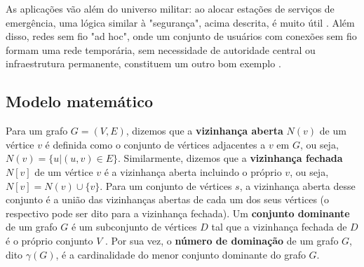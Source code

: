 \documentclass[11pt]{article}
\begin{document}
As aplicações vão além do universo militar: ao alocar estações de serviços de emergência, uma lógica similar à "segurança", acima descrita, é muito útil \autocite{GhaffariHadigheh2019Romandominationproblem}.
Além disso, redes sem fio "ad hoc", onde um conjunto de usuários com conexões sem fio formam uma rede temporária, sem necessidade de autoridade central ou infraestrutura permanente, constituem um outro bom exemplo \autocite{Wu2000Dominationitsapplications}.


\subsection{Modelo matemático}
\label{sec:orgb40ae0c}
Para um grafo \(G = (V, E)\), dizemos que a \textbf{vizinhança aberta} \(N(v)\) de um vértice \(v\) é definida como o conjunto de vértices adjacentes a \(v\) em \(G\), ou seja, \(N(v) = \{u|(u, v) \in E\}\).
Similarmente, dizemos que a \textbf{vizinhança fechada} \(N[v]\) de um vértice \(v\) é a vizinhança aberta incluindo o próprio \(v\), ou seja, \(N[v] = N(v) \cup \{v\}\).
Para um conjunto de vértices \(s\), a vizinhança aberta desse conjunto é a união das vizinhanças abertas de cada um dos seus vértices (o respectivo pode ser dito para a vizinhança fechada).
Um \textbf{conjunto dominante} de um grafo \(G\) é um subconjunto de vértices \(D\) tal que a vizinhança fechada de \(D\) é o próprio conjunto \(V\) .
Por sua vez, o \textbf{número de dominação} de um grafo \(G\), dito \(\gamma(G)\), é a cardinalidade do menor conjunto dominante do grafo \(G\).
\end{document}
